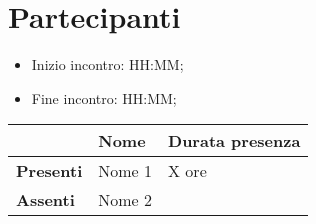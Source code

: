 \section{Partecipanti}

\begin{itemize}
    \item Inizio incontro: HH:MM;
    \item Fine incontro: HH:MM;
\end{itemize}


\begin{center}
{\renewcommand{\arraystretch}{1.5}
\begin{tabular}{lll}
	                    & \textbf{Nome}  & \textbf{Durata presenza} \\
	\hline
	\textbf{Presenti}   & Nome 1            & X ore     \\
	\hline
	\textbf{Assenti}	& Nome 2            &      		\\
\end{tabular}	
}
\end{center}